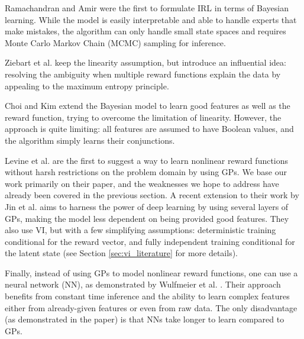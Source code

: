 \documentclass{mprop}
\theoremstyle{definition}
\begin{document}
Ramachandran and Amir \cite{DBLP:conf/ijcai/RamachandranA07} were the first to
formulate IRL in terms of Bayesian learning. While the model is easily
interpretable and able to handle experts that make mistakes, the algorithm can
only handle small state spaces and requires Monte Carlo Markov Chain (MCMC)
sampling for inference.

Ziebart et al. \cite{ziebart2008maximum} keep the linearity assumption, but
introduce an influential idea: resolving the ambiguity when multiple reward
functions explain the data by appealing to the maximum entropy principle.

Choi and Kim \cite{DBLP:conf/ijcai/ChoiK13} extend the Bayesian model to learn
good features as well as the reward function, trying to overcome the limitation
of linearity. However, the approach is quite limiting: all features are assumed
to have Boolean values, and the algorithm simply learns their conjunctions.

Levine et al. \cite{DBLP:conf/nips/LevinePK11} are the first to suggest a way to
learn nonlinear reward functions without harsh restrictions on the problem
domain by using GPs. We base our work primarily on their paper, and the
weaknesses we hope to address have already been covered in the previous section.
A recent extension to their work by Jin et al. \cite{DBLP:conf/uai/JinDAS17}
aims to harness the power of deep learning by using several layers of GPs,
making the model less dependent on being provided good features. They also use
VI, but with a few simplifying assumptions: deterministic training conditional
for the reward vector, and fully independent training conditional for the latent
state (see Section \ref{sec:vi_literature} for more details).

Finally, instead of using GPs to model nonlinear reward functions, one can use a
neural network (NN), as demonstrated by Wulfmeier et al.
\cite{wulfmeier2015maximum}. Their approach benefits from constant time
inference and the ability to learn complex features either from already-given
features or even from raw data. The only disadvantage (as demonstrated in the
paper) is that NNs take longer to learn compared to GPs.

\end{document}

